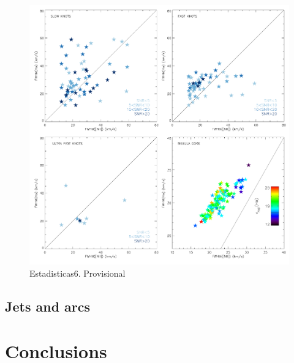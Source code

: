 \documentclass[a4paper,fleqn,usenatbib]{mnras}     %
\begin{document}
\begin{figure}
   \includegraphics[width=\columnwidth]{Figs/prov/WHa_WNII.pdf} 
    \caption{Estadisticas6. Provisional}
\end{figure}




\subsection{Jets and arcs}\label{sec:blueknots_relations}









\section{Conclusions}\label{sec:conclusions}



\end{document}
